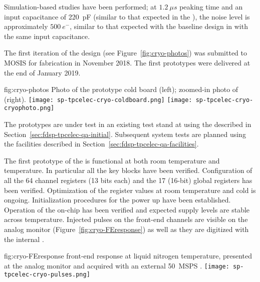 Simulation-based studies have been performed; at $\SI{1.2}{{\mu}s}$ peaking time and an 
input capacitance of \SI{220}{pF} (similar to that expected in the ), the noise 
level is approximately $\SI{500}{e^{-}}$, similar to that expected with the baseline 
 design in  with the same input capacitance.

The first iteration of the   design (see Figure~\ref{fig:cryo-photos}) 
was submitted to MOSIS for fabrication in November 2018. The first prototypes were 
delivered at the end of January 2019.

\begin{dunefigure}
{fig:cryo-photos}
{Photo of the prototype cold board (left); zoomed-in photo of   (right).}
\texttt{[image: sp-tpcelec-cryo-coldboard.png]}
\hspace{1cm}
\texttt{[image: sp-tpcelec-cryo-cryophoto.png]}
\end{dunefigure}

The prototypes are under test in an existing test stand at  using the 
described in Section~\ref{sec:fdsp-tpcelec-qa-initial}. Subsequent system tests are planned 
using the facilities described in Section~\ref{sec:fdsp-tpcelec-qa-facilities}.

The first prototype of the  is functional at both room temperature and \lntwo 
temperature. In particular all the key blocks have been verified. Configuration of all the 
64 channel registers (13 bits each) and the 17 (16-bit) global registers has been 
verified. Optimization of the register values at room temperature and cold is 
ongoing. Initialization procedures for the  power up have been established. 
Operation of the on-chip  has been verified and expected supply levels are 
stable across temperature. Injected pulses on the front-end channels are visible on 
the analog monitor (Figure~\ref{fig:cryo-FEresponse}) as well as they are digitized 
with the internal .

\begin{dunefigure}
{fig:cryo-FEresponse}
{  front-end response at liquid nitrogen temperature, presented at the analog monitor and acquired with an external \SI{50}{MSPS} .}
\texttt{[image: sp-tpcelec-cryo-pulses.png]}
\end{dunefigure}

